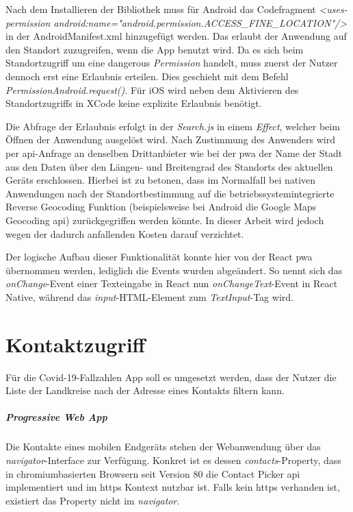 Nach dem Installieren der Bibliothek muss für Android das Codefragment \textit{<uses-permission android:name="android.permission.ACCESS\_FINE\_LOCATION"/>} in der AndroidManifest.xml hinzugefügt werden.
Das erlaubt der Anwendung auf den Standort zuzugreifen, wenn die App benutzt wird.
Da es sich beim Standortzugriff um eine \glqq dangerous\grqq{} \textit{Permission} handelt, muss zuerst der Nutzer dennoch erst eine Erlaubnis erteilen. 
Dies geschieht mit dem Befehl \textit{PermissionAndroid.request()}.
Für iOS wird neben dem Aktivieren des Standortzugriffs in XCode keine explizite Erlaubnis benötigt.

Die Abfrage der Erlaubnis erfolgt in der \textit{Search.js} in einem \textit{Effect}, welcher beim Öffnen der Anwendung ausgelöst wird.
Nach Zustimmung des Anwenders wird per \ac{api}-Anfrage an denselben Drittanbieter wie bei der \ac{pwa} der Name der Stadt aus den Daten über den Längen- und Breitengrad des Standorts des aktuellen Geräts erschlossen.
Hierbei ist zu betonen, dass im Normalfall bei nativen Anwendungen nach der Standortbestimmung auf die betriebssystemintegrierte Reverse Geocoding Funktion (beispielsweise bei Android die Google Maps Geocoding \ac{api}) zurückgegriffen werden könnte.
In dieser Arbeit wird jedoch wegen der dadurch anfallenden Kosten darauf verzichtet.

Der logische Aufbau dieser Funktionalität konnte hier von der React \ac{pwa} übernommen werden, lediglich die Events wurden abgeändert.
So nennt sich das \textit{onChange}-Event einer Texteingabe in React nun \textit{onChangeText}-Event in React Native, während das \textit{input}-HTML-Element zum \textit{TextInput}-Tag wird.

\section{Kontaktzugriff}

Für die Covid-19-Fallzahlen App soll es umgesetzt werden, dass der Nutzer die Liste der Landkreise nach der Adresse eines Kontakts filtern kann.

\subparagraph{Progressive Web App\\}
Die Kontakte eines mobilen Endgeräts stehen der Webanwendung über das \textit{navigator}-Interface zur Verfügung.
Konkret ist es dessen \textit{contacts}-Property, dass in chromiumbasierten Browsern seit Version 80 die Contact Picker \ac{api} implementiert und im \ac{https} Kontext nutzbar ist.
Falls kein \ac{https} verhanden ist, existiert das Property nicht im \textit{navigator}.

